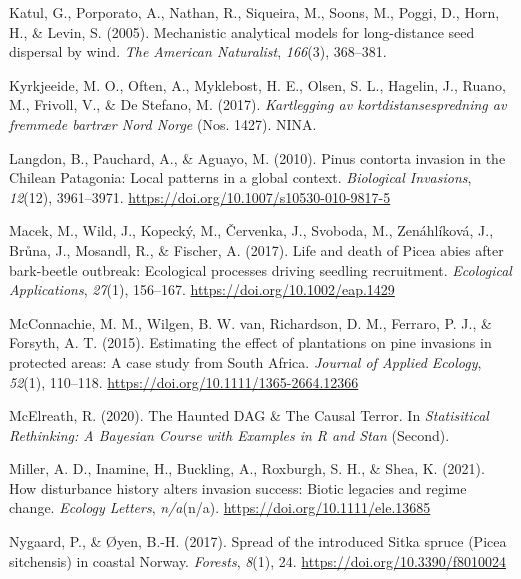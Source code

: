 \documentclass[
]{article}
\begin{document}
\leavevmode\hypertarget{ref-katulMechanisticAnalyticalModels2005}{}%
Katul, G., Porporato, A., Nathan, R., Siqueira, M., Soons, M., Poggi, D., Horn, H., \& Levin, S. (2005). Mechanistic analytical models for long-distance seed dispersal by wind. \emph{The American Naturalist}, \emph{166}(3), 368--381.

\leavevmode\hypertarget{ref-kyrkjeeideKartleggingAvKortdistansespredning2017}{}%
Kyrkjeeide, M. O., Often, A., Myklebost, H. E., Olsen, S. L., Hagelin, J., Ruano, M., Frivoll, V., \& De Stefano, M. (2017). \emph{Kartlegging av kortdistansespredning av fremmede bartrær Nord Norge} (Nos. 1427). NINA.

\leavevmode\hypertarget{ref-langdonPinusContortaInvasion2010}{}%
Langdon, B., Pauchard, A., \& Aguayo, M. (2010). Pinus contorta invasion in the Chilean Patagonia: Local patterns in a global context. \emph{Biological Invasions}, \emph{12}(12), 3961--3971. \url{https://doi.org/10.1007/s10530-010-9817-5}

\leavevmode\hypertarget{ref-macekLifeDeathPicea2017}{}%
Macek, M., Wild, J., Kopecký, M., Červenka, J., Svoboda, M., Zenáhlíková, J., Brůna, J., Mosandl, R., \& Fischer, A. (2017). Life and death of Picea abies after bark-beetle outbreak: Ecological processes driving seedling recruitment. \emph{Ecological Applications}, \emph{27}(1), 156--167. \url{https://doi.org/10.1002/eap.1429}

\leavevmode\hypertarget{ref-mcconnachieEstimatingEffectPlantations2015}{}%
McConnachie, M. M., Wilgen, B. W. van, Richardson, D. M., Ferraro, P. J., \& Forsyth, A. T. (2015). Estimating the effect of plantations on pine invasions in protected areas: A case study from South Africa. \emph{Journal of Applied Ecology}, \emph{52}(1), 110--118. \url{https://doi.org/10.1111/1365-2664.12366}

\leavevmode\hypertarget{ref-mcelreathHauntedDAGCausal2020}{}%
McElreath, R. (2020). The Haunted DAG \& The Causal Terror. In \emph{Statisitical Rethinking: A Bayesian Course with Examples in R and Stan} (Second).

\leavevmode\hypertarget{ref-millerHowDisturbanceHistory2021}{}%
Miller, A. D., Inamine, H., Buckling, A., Roxburgh, S. H., \& Shea, K. (2021). How disturbance history alters invasion success: Biotic legacies and regime change. \emph{Ecology Letters}, \emph{n/a}(n/a). \url{https://doi.org/10.1111/ele.13685}

\leavevmode\hypertarget{ref-nygaardSpreadIntroducedSitka2017}{}%
Nygaard, P., \& Øyen, B.-H. (2017). Spread of the introduced Sitka spruce (Picea sitchensis) in coastal Norway. \emph{Forests}, \emph{8}(1), 24. \url{https://doi.org/10.3390/f8010024}
\end{document}
